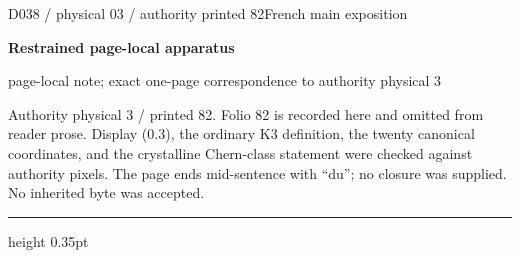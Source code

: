 \documentclass[9pt]{article}
\newcommand{\CanonText}[1]{\par{\fontsize{8.0}{9.35}\selectfont\RaggedRight #1\par}\vspace{2.2pt}}
\newcommand{\LayerTitle}{Restrained page-local apparatus}
\begin{document}
\noindent\begin{minipage}[t][\dimexpr\textheight-5pt\relax][t]{\textwidth}
{\sffamily\fontsize{7.3}{8.2}\selectfont\color{Quiet} D038 / physical 03 / authority printed 82\hfill French main exposition}
\par{}\vspace{4.5pt}
{\sffamily\fontsize{10.4}{11.6}\selectfont\bfseries\color{Accent} \LayerTitle}
\par{\sffamily\fontsize{6.7}{7.7}\selectfont\color{Quiet} page-local note; exact one-page correspondence to authority physical 3}
\vspace{5pt}
\CanonText{Authority physical 3 / printed 82. Folio 82 is recorded here and omitted from reader prose. Display (0.3), the ordinary K3 definition, the twenty canonical coordinates, and the crystalline Chern-class statement were checked against authority pixels. The page ends mid-sentence with “du”; no closure was supplied. No inherited byte was accepted.}
\vfill
{\color{Accent}\hrule height 0.35pt}\vspace{3pt}
\end{minipage}
\newpage
\end{document}
